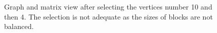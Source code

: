 \documentclass[12pt, oneside]{book}
\begin{document}
\begin{figure}
\centering
{}%
\caption{Graph and matrix view after selecting the vertices number 10 and then 4. The selection is not adequate as the sizes of blocks are not balanced.}
\label{selected410}
\end{figure}
\end{document}
